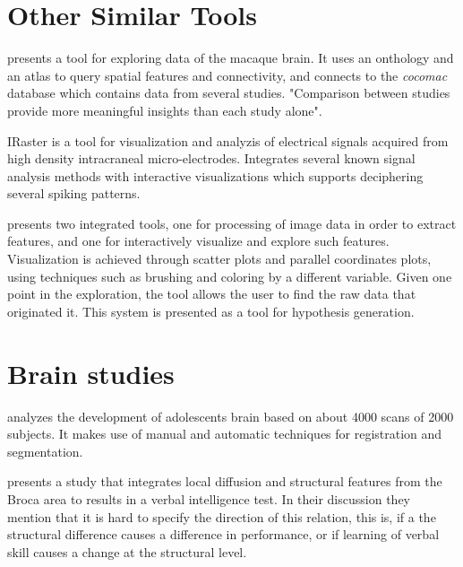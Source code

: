 \section{Other Similar Tools}

\autocite{bezgin_matching_2009} presents a tool for exploring data of the macaque brain. It uses an onthology and an atlas to query spatial features and connectivity, and connects to the \emph{cocomac} database which contains data from several studies. "Comparison between studies provide more meaningful insights than each study alone".

IRaster \autocite{somerville_iraster:_2010}  is a tool for visualization and analyzis of electrical signals acquired from high density intracraneal micro-electrodes. Integrates several known signal analysis methods with interactive visualizations which supports deciphering several spiking patterns.

\autocite{steenwijk_integrated_2010} presents two integrated tools, one for processing of image data in order to extract features, and one for interactively visualize and explore such features. Visualization is achieved through scatter plots and parallel coordinates plots, using techniques such as brushing and coloring by a different variable.  Given one point in the exploration, the tool allows the user to find the raw data that originated it. This system is presented as a tool for hypothesis generation. 

\section{Brain studies}

\autocite{lenroot_brain_2006} analyzes the development of adolescents brain based on about 4000 scans of 2000 subjects. It makes use of manual and automatic techniques for registration and segmentation.

\autocite{konrad_vbmdti_2012} presents a study that integrates local diffusion and structural features from the Broca area to results in a verbal intelligence test. In their discussion they mention that it is hard to specify the direction of this relation, this is, if a the structural difference causes a difference in performance, or if learning of verbal skill causes a change at the structural level. 